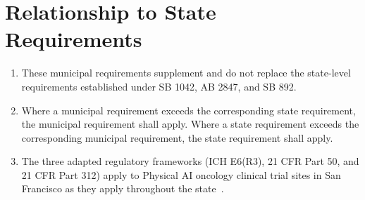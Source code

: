 \section{Relationship to State Requirements}

\begin{enumerate}[label=(\alph*)]
\item These municipal requirements supplement and do not replace the
  state-level requirements established under SB 1042, AB 2847, and SB 892.

\item Where a municipal requirement exceeds the corresponding state requirement,
  the municipal requirement shall apply. Where a state requirement exceeds the
  corresponding municipal requirement, the state requirement shall apply.

\item The three adapted regulatory frameworks (ICH E6(R3), 21 CFR Part 50, and
  21 CFR Part 312) apply to Physical AI oncology clinical trial sites in San
  Francisco as they apply throughout the state~\cite{iche6r3adapt,cfr50adapt,cfr312adapt}.
\end{enumerate}

